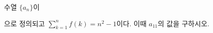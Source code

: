 \hspace*{2mm}\begin{minipage}[t]{\dimexpr\linewidth-2mm\relax}\vspace{0pt}
수열 $\{a_n\}$이 \par\smallskip{}\par\smallskip\noindent 으로 정의되고 $\displaystyle\sum_{k=1}^{n}f(k)=n^2-1$이다. 이때 $a_{11}$의 값을 구하시오.\end{minipage}
